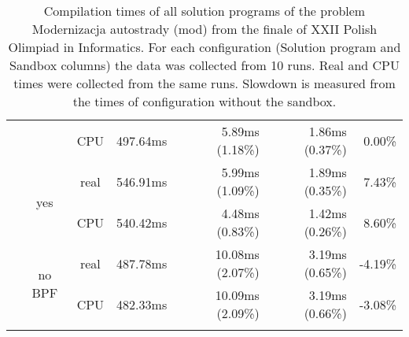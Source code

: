 \documentclass[en]{pracamgr}
\begin{document}
\begin{appendices}
\begin{small}
\begin{longtable}{|l|c|c|r|r|r|r|}
                            &                         & CPU  & 497.64ms & 5.89ms (1.18\%) & 1.86ms (0.37\%) & 0.00\% \\*
                            \cline{2-7}
                            & \multirow{2}{*}{yes}    & real & 546.91ms & 5.99ms (1.09\%) & 1.89ms (0.35\%) & 7.43\% \\*
                            &                         & CPU  & 540.42ms & 4.48ms (0.83\%) & 1.42ms (0.26\%) & 8.60\% \\*
                            \cline{2-7}
                            & \multirow{2}{*}{no BPF} & real & 487.78ms & 10.08ms (2.07\%) & 3.19ms (0.65\%) & -4.19\% \\*
                            &                         & CPU  & 482.33ms & 10.09ms (2.09\%) & 3.19ms (0.66\%) & -3.08\% \\
\hline
\caption{Compilation times of all solution programs of the problem Modernizacja autostrady (mod) from the finale of XXII Polish Olimpiad in Informatics. For each configuration (Solution program and Sandbox columns) the data was collected from 10 runs. Real and CPU times were collected from the same runs. Slowdown is measured from the times of configuration without the sandbox.}
\label{table:mod_compilation}
\end{longtable}
\end{small}


\end{appendices}
\end{document}

